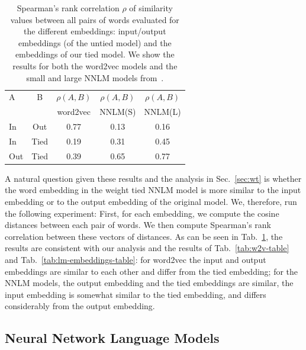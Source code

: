 \documentclass[11pt]{article}
\begin{document}
\begin{table}[t]


\begin{center}
\begin{small}
\begin{tabular}{lc|ccc}
\hline
A                & B                     & $\rho(A,B)$ & $\rho(A,B)$ & $\rho(A,B)$ \\ 
& & word2vec & NNLM(S) & NNLM(L) \\ \hline
In   & Out      & 0.77&0.13 & 0.16                          \\ 
In   & Tied & 0.19& 0.31& 0.45                        \\ 
Out  & Tied & 0.39 &0.65 & 0.77                         \\ \hline
\end{tabular}
\end{small}
\end{center}
\caption{\small Spearman's rank correlation $\rho$ of similarity values between all pairs of words evaluated for the different embeddings: input/output embeddings (of the untied model) and the embeddings of our tied model. We show the results for both the word2vec models and the small and large NNLM models from~\protect\cite{zaremba14}.}
\label{tab:emb-dist-spearm}
\end{table}

A natural question given these results and the analysis in Sec.~\ref{sec:wt} is whether the word embedding in the weight tied NNLM model is more similar to the input embedding or to the output embedding of the original model. We, therefore, run the following experiment: First, for each embedding, we compute the cosine distances between each pair of words.  We then compute Spearman's rank correlation between these vectors of distances. As can be seen in Tab.~\ref{tab:emb-dist-spearm}, the results are consistent with our analysis and the results of Tab.~\ref{tab:w2v-table} and Tab.~\ref{tab:lm-embeddings-table}: for word2vec the input and output embeddings are similar to each other and differ from the tied embedding; for the NNLM models, the output embedding and the tied embeddings are similar, the input embedding is somewhat similar to the tied embedding, and differs considerably from the output embedding.










\subsection{Neural Network Language Models}
\end{document}
